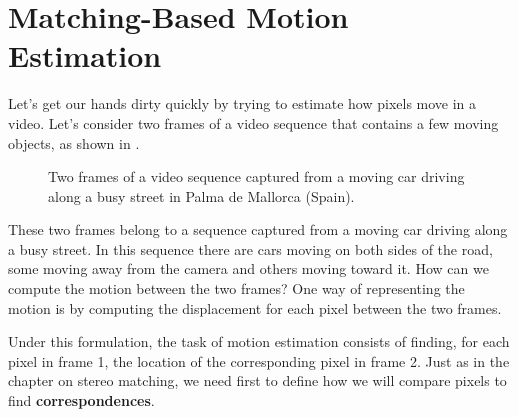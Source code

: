 \section{Matching-Based Motion Estimation}
\label{sec:matching_based_motion}
Let's get our hands dirty quickly by trying to estimate how pixels move in a video. Let's consider two frames of a video sequence that contains a few moving objects, as shown in \fig{\ref{fig:two_frames_from_palma_street}}. 

\begin{figure}
\centerline{
%
}
\caption{Two frames of a video sequence captured from a moving car driving along a busy street in Palma de Mallorca (Spain).}
\label{fig:two_frames_from_palma_street}
\end{figure}

These two frames belong to a sequence captured from a moving car driving along a busy street. In this sequence there are cars moving on both sides of the road, some moving away from the camera and others moving toward it.  How can we compute the motion between the two frames? One way of representing the motion is by computing the displacement for each pixel between the two frames.   

Under this formulation, the task of motion estimation consists of finding, for each pixel in frame 1, the location of the corresponding pixel in frame 2. Just as in the chapter on stereo matching, we need first to define how we will compare pixels to find {\bf correspondences}. 

